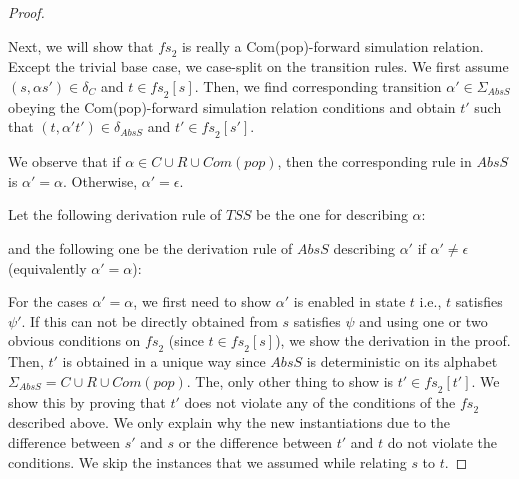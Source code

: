 \begin{proof}
\begin{itemize}
\end{itemize}
Next, we will show that $\mathit{fs}_2$ is really a Com(pop)-forward simulation relation. Except the trivial base case, we case-split on the transition rules. We first assume $(s, \alpha s') \in \delta_C$ and $t \in \mathit{fs}_2[s]$. Then, we find  corresponding transition $\alpha' \in \Sigma_{AbsS}$ obeying the Com(pop)-forward simulation relation conditions and obtain $t'$ such that $(t, \alpha' t') \in \delta_{AbsS}$  and $t' \in \mathit{fs}_2[s']$.

We observe that if $\alpha \in C \cup R \cup Com(pop)$, then the corresponding rule in $AbsS$ is $\alpha' = \alpha$. Otherwise, $\alpha' = \epsilon$.

Let the following derivation rule of $TSS$ be the one for describing $\alpha$:
\begin{mathpar}
\end{mathpar}
and the following one be the derivation rule of $AbsS$ describing $\alpha'$ if $\alpha' \neq \epsilon$ (equivalently $\alpha' = \alpha$):
\begin{mathpar}
\end{mathpar}
For the cases $\alpha' = \alpha$, we first need to show $\alpha'$ is enabled in state $t$ i.e., $t$ satisfies $\psi'$. If this can not be directly obtained from $s$ satisfies $\psi$ and using one or two obvious conditions on $\mathit{fs}_2$ (since $t \in \mathit{fs}_2[s]$), we show the derivation in the proof. Then, $t'$ is obtained in a unique way since $AbsS$ is deterministic on its alphabet $ \Sigma_{AbsS} = C \cup R \cup Com(pop)$. The, only other thing to show is $t' \in \mathit{fs}_2[t']$. We show this by proving that $t'$ does not violate any of the conditions of the $\mathit{fs}_2$ described above. We only explain why the new instantiations due to the difference between $s'$ and $s$ or the difference between $t'$ and $t$ do not violate the conditions. We skip the instances that we assumed while relating $s$ to $t$.


\end{proof}
